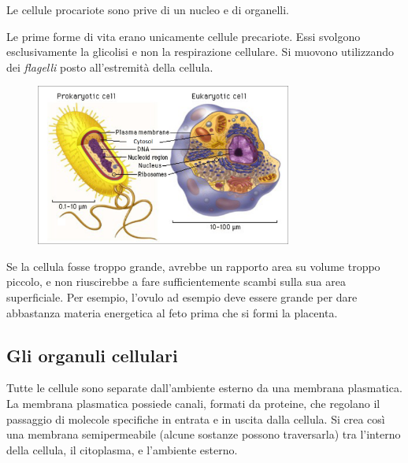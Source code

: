 \documentclass[a4paper]{article}
\begin{document}
Le cellule procariote sono prive di un nucleo e di organelli.

Le prime forme di vita erano unicamente cellule precariote.
Essi svolgono esclusivamente la glicolisi e non la respirazione cellulare.
Si muovono utilizzando dei \textit{flagelli} posto all'estremità della cellula.

\begin{figure}[th]
    \centering
    \includegraphics[width=0.75\textwidth]{./prok-euka.png}
\end{figure}

Se la cellula fosse troppo grande, avrebbe un rapporto area su volume troppo piccolo, e non riuscirebbe
a fare sufficientemente scambi sulla sua area superficiale.
Per esempio, l'ovulo ad esempio deve essere grande per dare
abbastanza materia energetica al feto prima che si
formi la placenta.

\pagebreak

\subsection{Gli organuli cellulari}


Tutte le cellule sono separate dall'ambiente esterno da
una membrana plasmatica.
La membrana plasmatica possiede canali, formati da proteine, che regolano il passaggio di molecole
specifiche in entrata e in uscita dalla cellula.
Si crea così una membrana semipermeabile (alcune sostanze possono traversarla) tra l'interno
della cellula, il citoplasma, e l'ambiente esterno.
\end{document}
